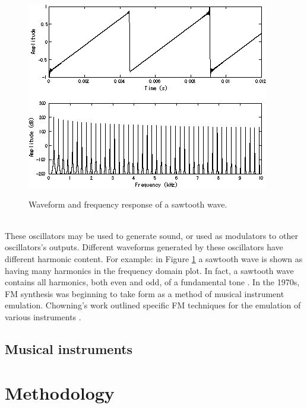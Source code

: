 \documentclass{article}
\begin{document}
        \begin{figure}[h]
            \includegraphics[scale=0.6]{images/Sawtooth.png}%
            \centering
            \caption{Waveform and frequency response of a sawtooth wave.}\cite{kraft2017lp}
            \label{sawtooth}
        \end{figure}
        \\
        These oscillators may be used to generate sound, or used as modulators to other oscillators's outputs.
        Different waveforms generated by these oscillators have different harmonic content.
        For example: in Figure \ref{sawtooth} a sawtooth wave is shown as having many harmonics in the frequency domain plot.
        In fact, a sawtooth wave contains all harmonics, both even and odd, of a fundamental tone \cite{roederer1995physics}.
        In the 1970s, FM synthesis was beginning to take form as a method of musical instrument emulation. Chowning's work outlined specific FM techniques for the emulation of various instruments \cite{chowning1973synthesis}.
        
    \subsection{Musical instruments}

\section{Methodology}
\end{document}
